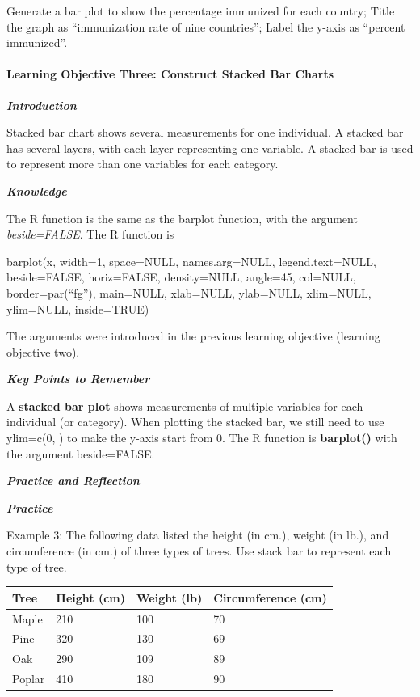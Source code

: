 Generate a bar plot to show the percentage immunized for each country;
Title the graph as ``immunization rate of nine countries''; Label the
y-axis as ``percent immunized''.

\hypertarget{learning-objective-three-construct-stacked-bar-charts}{%
\paragraph{Learning Objective Three: Construct Stacked Bar
Charts}\label{learning-objective-three-construct-stacked-bar-charts}}

\emph{\textbf{Introduction}}

Stacked bar chart shows several measurements for one individual. A
stacked bar has several layers, with each layer representing one
variable. A stacked bar is used to represent more than one variables for
each category.

\emph{\textbf{Knowledge}}

The R function is the same as the barplot function, with the argument
\emph{beside=FALSE}. The R function is

barplot(x, width=1, space=NULL, names.arg=NULL, legend.text=NULL,
beside=FALSE, horiz=FALSE, density=NULL, angle=45, col=NULL,
border=par(``fg''), main=NULL, xlab=NULL, ylab=NULL, xlim=NULL,
ylim=NULL, inside=TRUE)

The arguments were introduced in the previous learning objective
(learning objective two).

\emph{\textbf{Key Points to Remember}}

A \textbf{stacked bar plot} shows measurements of multiple variables for
each individual (or category). When plotting the stacked bar, we still
need to use ylim=c(0, ) to make the y-axis start from 0. The R function
is \textbf{barplot()} with the argument beside=FALSE.

\emph{\textbf{Practice and Reflection}}

\emph{\textbf{Practice}}

Example 3: The following data listed the height (in cm.), weight (in
lb.), and circumference (in cm.) of three types of trees. Use stack bar
to represent each type of tree.

\begin{longtable}[]{@{}llll@{}}
\toprule
Tree & Height (cm) & Weight (lb) & Circumference (cm)\tabularnewline
\midrule
\endhead
Maple & 210 & 100 & 70\tabularnewline
Pine & 320 & 130 & 69\tabularnewline
Oak & 290 & 109 & 89\tabularnewline
Poplar & 410 & 180 & 90\tabularnewline
\bottomrule
\end{longtable}

